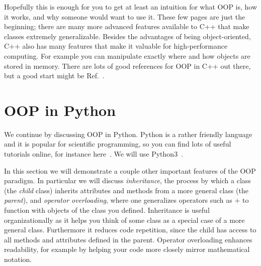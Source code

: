 Hopefully this is enough for you to get at least an intuition for
what OOP is, how it works, and why someone would want to use it. These
few pages are just the beginning; there are many more advanced
features available to C++ that make classes extremely generalizable.
Besides the advantages of being object-oriented, C++ also has many
features that make it valuable for high-performance computing.
For example you can manipulate exactly where and how objects
are stored in memory. There are lots of good references for OOP
in C++ out there, but a good start might be Ref.~\cite{tp:cpp}.\\




\section{OOP in Python}

We continue by discussing OOP in Python. Python is a rather friendly language
and it is popular for scientific programming, so you can find lots of useful
tutorials online, for instance here~\cite{pythonOOP}. We will use
Python3~\cite{python3}.

In this section we will demonstrate
a couple other important features of the OOP paradigm. In particular we will
discuss {\it inheritance}, the process by which a
class (the {\it child} class) inherits attributes and methods
from a more general class (the {\it parent}), and
{\it operator overloading},  where one generalizes 
operators such as $+$ to function with objects of the class you defined.
Inheritance is useful organizationally as it helps you think of some class
as a special case of a more general class. Furthermore it reduces code
repetition, since the child has access to all methods and attributes defined in
the parent. Operator overloading enhances readability, for example by
helping your code more closely mirror mathematical notation.\\



